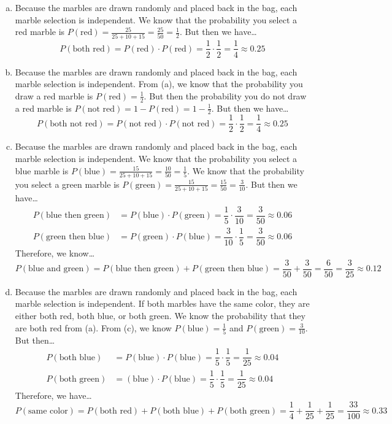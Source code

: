 \documentclass[11pt,letterpaper]{article}
\begin{document}
\sol 
\begin{enumerate}[(a)]
\item Because the marbles are drawn randomly and placed back in the bag, each marble selection is independent. We know that the probability you select a red marble is $P(\text{red})= \frac{25}{25 + 10 + 15}= \frac{25}{50}= \frac{1}{2}$. But then we have\dots
	\[
	P(\text{both red})= P(\text{red}) \cdot P(\text{red})= \dfrac{1}{2} \cdot \dfrac{1}{2}= \dfrac{1}{4} \approx 0.25
	\]

\item Because the marbles are drawn randomly and placed back in the bag, each marble selection is independent. From (a), we know that the probability you draw a red marble is $P(\text{red})= \frac{1}{2}$. But then the probability you do not draw a red marble is $P(\text{not red})= 1 - P(\text{red})= 1 - \frac{1}{2}$. But then we have\dots
	\[
	P(\text{both not red})= P(\text{not red}) \cdot P(\text{not red})= \dfrac{1}{2} \cdot \dfrac{1}{2}= \dfrac{1}{4} \approx 0.25
	\]

\item Because the marbles are drawn randomly and placed back in the bag, each marble selection is independent. We know that the probability you select a blue marble is $P(\text{blue})= \frac{15}{25 + 10 + 15}= \frac{10}{50}= \frac{1}{5}$. We know that the probability you select a green marble is $P(\text{green})= \frac{15}{25 + 10 + 15}= \frac{15}{50}= \frac{3}{10}$. But then we have\dots
	\[
	\begin{aligned}
	P(\text{blue then green})&= P(\text{blue}) \cdot P(\text{green})= \dfrac{1}{5} \cdot \dfrac{3}{10}= \dfrac{3}{50} \approx 0.06 \\[0.3cm]
	P(\text{green then blue})&= P(\text{green}) \cdot P(\text{blue})= \dfrac{3}{10} \cdot \dfrac{1}{5}= \dfrac{3}{50} \approx 0.06
	\end{aligned}
	\]
Therefore, we know\dots
	\[
	P(\text{blue and green})= P(\text{blue then green}) + P(\text{green then blue})= \dfrac{3}{50} + \dfrac{3}{50}= \dfrac{6}{50}= \dfrac{3}{25} \approx 0.12
	\]

\item Because the marbles are drawn randomly and placed back in the bag, each marble selection is independent. If both marbles have the same color, they are either both red, both blue, or both green. We know the probability that they are both red from (a). From (c), we know $P(\text{blue})= \frac{1}{5}$ and $P(\text{green})= \frac{3}{10}$. But then\dots
	\[
	\begin{aligned}
	P(\text{both blue})&= P(\text{blue}) \cdot P(\text{blue})= \dfrac{1}{5} \cdot \dfrac{1}{5}= \dfrac{1}{25} \approx 0.04 \\[0.3cm]
	P(\text{both green})&= (\text{blue}) \cdot P(\text{blue})= \dfrac{1}{5} \cdot \dfrac{1}{5}= \dfrac{1}{25} \approx 0.04
	\end{aligned}
	\]
Therefore, we have\dots
	\[
	P(\text{same color})= P(\text{both red}) + P(\text{both blue}) + P(\text{both green})= \dfrac{1}{4} + \dfrac{1}{25} + \dfrac{1}{25}= \dfrac{33}{100} \approx 0.33
	\]
\end{enumerate}
\end{document}
